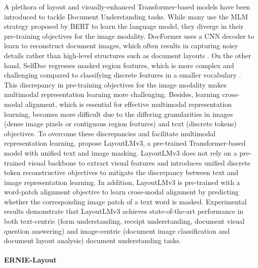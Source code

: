 A plethora of layout and visually-enhanced Transformer-based models have been introduced to tackle Document Understanding tasks. While many use the \ac{MLM} strategy proposed by \ac{BERT} to learn the language model, they diverge in their pre-training objectives for the image modality. DocFormer \citep{appalaraju2021docformer} uses a \ac{CNN} decoder to learn to reconstruct document images, which often results in capturing noisy details rather than high-level structures such as document layouts \citep{ramesh2021zero}. On the other hand, SelfDoc \citep{li2021selfdoc} regresses masked region features, which is more complex and challenging compared to classifying discrete features in a smaller vocabulary \citep{cho2020x}. This discrepancy in pre-training objectives for the image modality makes multimodal representation learning more challenging. Besides, learning cross-modal alignment, which is essential for effective multimodal representation learning, becomes more difficult due to the differing granularities in images (dense image pixels or contiguous region features) and text (discrete tokens) objectives. To overcome these discrepancies and facilitate multimodal representation learning, \citet{huang2022layoutlmv3} propose LayoutLMv3, a pre-trained Transformer-based model with unified text and image masking. LayoutLMv3 does not rely on a pre-trained visual backbone to extract visual features and introduces unified discrete token reconstructive objectives to mitigate the discrepancy between text and image representation learning. In addition, LayoutLMv3 is pre-trained with a word-patch alignment objective to learn cross-modal alignment by predicting whether the corresponding image patch of a text word is masked. Experimental results demonstrate that LayoutLMv3 achieves state-of-the-art performance in both text-centric (form understanding, receipt understanding, document visual question answering) and image-centric (document image classification and document layout analysis) document understanding tasks.

\paragraph{ERNIE-Layout}

